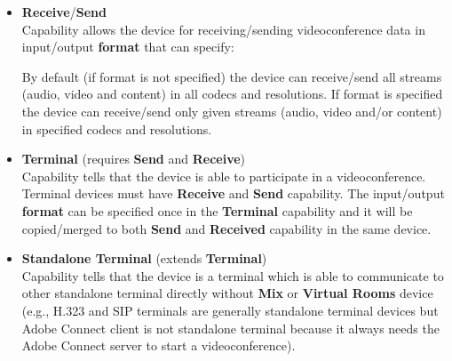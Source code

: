 \begin{itemize}
\newcommand{\RequireCapability}[1]{(requires #1)}
\newcommand{\ExtendCapability}[1]{(extends #1)}
  
\item \textbf{Receive}/\textbf{Send} \\
  Capability allows the device for receiving/sending videoconference data in
  input/output \textbf{format} that can specify:
  By default (if format is not specified) the device can receive/send all 
  streams (audio, video and content) in all codecs and resolutions.
  If format is specified the device can receive/send only
  given streams (audio, video and/or content) in specified 
  codecs and resolutions.
  
\item \textbf{Terminal} %
  \RequireCapability{\textbf{Send} and \textbf{Receive}} \\
  Capability tells that the device is able to participate in a 
  videoconference. Terminal devices must have \textbf{Receive} and 
  \textbf{Send} capability. The input/output \textbf{format} can be 
  specified once in the \textbf{Terminal} capability and it will be 
  copied/merged to both \textbf{Send} and \textbf{Received} capability in the 
  same device.
  
\item \textbf{Standalone Terminal} \ExtendCapability{\textbf{Terminal}} \\
  Capability tells that the device is a terminal which is able to communicate 
  to other standalone terminal directly without \textbf{Mix} or 
  \textbf{Virtual Rooms} device (e.g., H.323 and SIP terminals are generally 
  standalone terminal devices but Adobe Connect client is not standalone 
  terminal because it always needs the Adobe Connect server to start a 
  videoconference).
  
  \\ 
  

\end{itemize}
